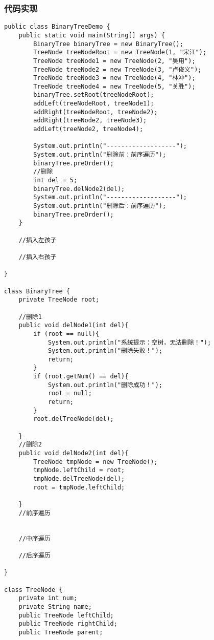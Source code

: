 \documentclass[a4paper]{report}
\begin{document}
\subsubsection{代码实现}
\begin{lstlisting}
public class BinaryTreeDemo {
    public static void main(String[] args) {
        BinaryTree binaryTree = new BinaryTree();
        TreeNode treeNodeRoot = new TreeNode(1, "宋江");
        TreeNode treeNode1 = new TreeNode(2, "吴用");
        TreeNode treeNode2 = new TreeNode(3, "卢俊义");
        TreeNode treeNode3 = new TreeNode(4, "林冲");
        TreeNode treeNode4 = new TreeNode(5, "关胜");
        binaryTree.setRoot(treeNodeRoot);
        addLeft(treeNodeRoot, treeNode1);
        addRight(treeNodeRoot, treeNode2);
        addRight(treeNode2, treeNode3);
        addLeft(treeNode2, treeNode4);

        System.out.println("-------------------");
        System.out.println("删除前：前序遍历");
        binaryTree.preOrder();
        //删除
        int del = 5;
        binaryTree.delNode2(del);
        System.out.println("-------------------");
        System.out.println("删除后：前序遍历");
        binaryTree.preOrder();
    }

    //插入左孩子

    //插入右孩子

}

class BinaryTree {
    private TreeNode root;

    //删除1
    public void delNode1(int del){
        if (root == null){
            System.out.println("系统提示：空树，无法删除！");
            System.out.println("删除失败！");
            return;
        }
        if (root.getNum() == del){
            System.out.println("删除成功！");
            root = null;
            return;
        }
        root.delTreeNode(del);

    }
    //删除2
    public void delNode2(int del){
        TreeNode tmpNode = new TreeNode();
        tmpNode.leftChild = root;
        tmpNode.delTreeNode(del);
        root = tmpNode.leftChild;

    }
    //前序遍历


    //中序遍历

    //后序遍历

}

class TreeNode {
    private int num;
    private String name;
    public TreeNode leftChild;
    public TreeNode rightChild;
    public TreeNode parent;




\end{lstlisting}
\end{document}
